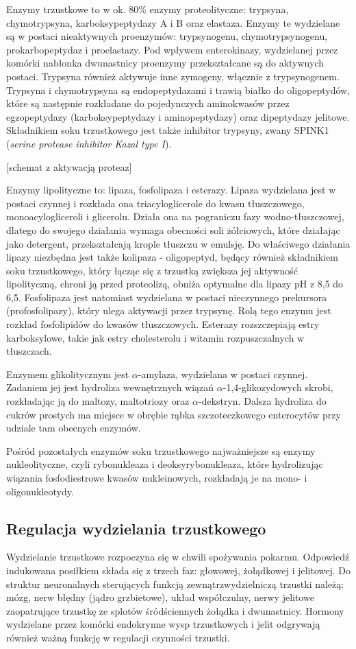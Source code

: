 \documentclass[a4paper, 12pt]{report}
\begin{document}
Enzymy trzustkowe to w ok. 80\% enzymy proteolityczne: trypsyna,
chymotrypsyna, karboksypeptydazy A i B oraz elastaza. Enzymy te
wydzielane są w postaci nieaktywnych proenzymów: trypsynogenu, chymotrypsynogenu,
prokarbopeptydaz i proelastazy. Pod wpływem enterokinazy, wydzielanej
przez komórki nabłonka dwunastnicy proenzymy przekształcane są do
aktywnych postaci. Trypsyna również aktywuje inne zymogeny, włącznie z
trypsynogenem. Trypsyna i chymotrypsyna są endopeptydazami i
trawią białko do oligopeptydów, które są następnie rozkładane do
pojedynczych aminokwasów przez egzopeptydazy (karboksypeptydazy i
aminopeptydazy) oraz dipeptydazy jelitowe. Składnikiem soku
trzustkowego jest także inhibitor trypsyny, zwany SPINK1
(\textsl{serine protease inhibitor Kazal type I}).

[schemat z aktywacją proteaz]

Enzymy lipolityczne to: lipaza, fosfolipaza i esterazy. Lipaza
wydzielana jest w postaci czynnej i rozkłada ona triacyloglicerole do
kwasu tłuszczowego, monoacylogliceroli i glicerolu. Działa ona na
pograniczu fazy wodno-tłuszczowej, dlatego do swojego działania wymaga
obecności soli żółciowych, które działając jako detergent,
przekształcają krople tłuszczu w emulsję. Do właściwego działania
lipazy niezbędna jest także kolipaza - oligopeptyd, będący również
składnikiem soku trzustkowego, który łącząc się z trzustką zwiększa
jej aktywność lipolityczną, chroni ją przed proteolizą, obniża
optymalne dla lipazy pH z 8,5 do 6,5. Fosfolipaza jest natomiast
wydzielana w postaci nieczynnego prekursora (profosfolipazy), który
ulega aktywacji przez trypsynę. Rolą tego enzymu jest rozkład
fosfolipidów do kwasów tłuszczowych. Esterazy rozszczepiają estry karboksylowe, takie jak
estry cholesterolu i witamin rozpuszczalnych w tłuszczach.

Enzymem glikolitycznym jest $\alpha$-amylaza, wydzielana w postaci
czynnej. Zadaniem jej jest hydroliza wewnętrznych wiązań
$\alpha$-1,4-glikozydowych skrobi, rozkładając ją do maltozy,
maltotriozy oraz $\alpha$-dekstryn. Dalsza hydroliza do cukrów
prostych ma miejsce w obrębie rąbka szczoteczkowego enterocytów przy
udziale tam obecnych enzymów.

Pośród pozostałych enzymów soku trzustkowego najważniejsze są enzymy
nukleolityczne, czyli rybonukleaza i deoksyrybonukleaza, które
hydrolizując wiązania fosfodiestrowe kwasów nukleinowych, rozkładają
je na mono- i oligonukleotydy.

\subsection{Regulacja wydzielania trzustkowego}
Wydzielanie trzustkowe rozpoczyna się w chwili spożywania
pokarmu. Odpowiedź indukowana posiłkiem składa się z trzech faz:
głowowej, żołądkowej i jelitowej. Do struktur neuronalnych
sterujących funkcją zewnątrzwydzielniczą trzustki należą: mózg, nerw
błędny (jądro grzbietowe), układ współczulny, nerwy jelitowe
zaopatrujące trzustkę ze splotów śródściennych żołądka i dwunastnicy.
Hormony wydzielane przez komórki endokrynne wysp trzustkowych i jelit
odgrywają również ważną funkcję w regulacji czynności trzustki.
\end{document}
